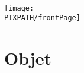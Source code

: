 
\maketitle

\thispagestyle{empty}

\hfill\\
\vfill


\begin{center}
    \texttt{[image: \\PIXPATH/frontPage]}
\end{center}

\section*{Objet}
\Object
